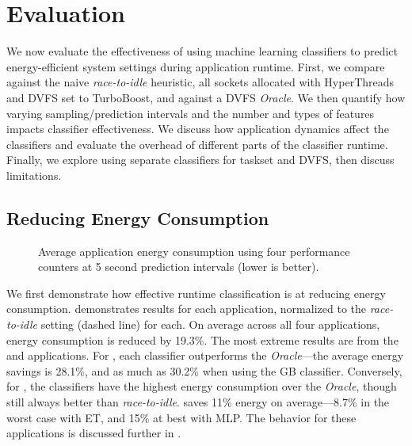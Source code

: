 \section{Evaluation}
\label{sec:classifiers-evaluation}

We now evaluate the effectiveness of using machine learning classifiers to predict energy-efficient system settings during application runtime.
First, we compare against the naive \emph{race-to-idle} heuristic, \ie all sockets allocated with HyperThreads and DVFS set to TurboBoost, and against a DVFS \emph{Oracle}.
We then quantify how varying sampling/prediction intervals and the number and types of features impacts classifier effectiveness.
We discuss how application dynamics affect the classifiers and evaluate the overhead of different parts of the classifier runtime.
Finally, we explore using separate classifiers for taskset and DVFS, then discuss limitations.


\subsection{Reducing Energy Consumption}
\label{sec:eval-first}

\begin{figure}[t]
  \centering
  
  \caption{Average application energy consumption using four performance counters at 5 second prediction intervals (lower is better).}
  \label{fig:compare-apps-pca4}
\end{figure}

We first demonstrate how effective runtime classification is at reducing energy consumption.
 demonstrates results for each application, normalized to the \emph{race-to-idle} setting (dashed line) for each.
On average across all four applications, energy consumption is reduced by 19.3\%.
The most extreme results are from the  and  applications.
For , each classifier outperforms the \emph{Oracle}---the average energy savings is 28.1\%, and as much as 30.2\% when using the GB classifier.
Conversely, for , the classifiers have the highest energy consumption over the \emph{Oracle}, though still always better than \emph{race-to-idle}.
 saves 11\% energy on average---8.7\% in the worst case with ET, and 15\% at best with MLP.
The behavior for these applications is discussed further in .

